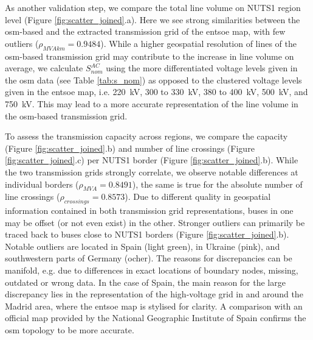 \documentclass[fleqn,10pt]{wlscirep}
\let\autocite\cite
\begin{document}
As another validation step, we compare the total line volume on NUTS1 region level (Figure \ref{fig:scatter_joined}.a). Here we see strong similarities between the \acrshort{osm}-based and the extracted transmission grid of the \acrshort{entsoe} map, with few outliers ($\rho_{MVAkm} = 0.9484$). While a higher geospatial resolution of lines of the \gls{osm}-based transmission grid may contribute to the increase in line volume on average, we calculate $S_{nom}^{AC}$ using the more differentiated voltage levels given in the \gls{osm} data (see Table \ref{tab:s_nom}) as opposed to the clustered voltage levels given in the \acrshort{entsoe} map, i.e. \SI{220}{\kilo\volt}, 300 to \SI{330}{\kilo\volt}, 380 to \SI{400}{\kilo\volt}, \SI{500}{\kilo\volt}, and \SI{750}{\kilo\volt}. This may lead to a more accurate representation of the line volume in the \gls{osm}-based transmission grid.

To assess the transmission capacity across regions, we compare the capacity (Figure \ref{fig:scatter_joined}.b) and number of line crossings (Figure \ref{fig:scatter_joined}.c) per NUTS1 border (Figure \ref{fig:scatter_joined}.b). While the two transmission grids strongly correlate, we observe notable differences at individual borders ($\rho_{MVA} = 0.8491$), the same is true for the absolute number of line crossings ($\rho_{crossings} = 0.8573$). Due to different quality in geospatial information contained in both transmission grid representations, buses in one may be offset (or not even exist) in the other. Stronger outliers can primarily be traced back to buses close to NUTS1 borders (Figure \ref{fig:scatter_joined}.b). Notable outliers are located in Spain (light green), in Ukraine (pink), and southwestern parts of Germany (ocher). The reasons for discrepancies can be manifold, e.g. due to differences in exact locations of boundary nodes, missing, outdated or wrong data. In the case of Spain, the main reason for the large discrepancy lies in the representation of the high-voltage grid in and around the Madrid area, where the \acrshort{entsoe} map is stylised for clarity. A comparison with an official map provided by the National Geographic Institute of Spain\autocite{institutogeograficonacionalEnergiaMapaRed2016} confirms the \gls{osm} topology to be more accurate.
\end{document}
